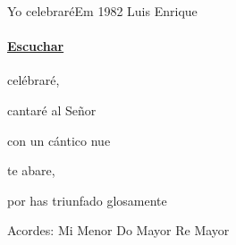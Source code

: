 \documentclass[12pt, spanish]{book}
\begin{document}
    \begin{song}{Yo celebraré}{Em}
    {1982} %
    {Luis Enrique}
    {} %
    {}
        \ifChordBk
        \paragraph{\mbox{}\hfill\protect\href{https://www.youtube.com/watch?v=YugnfLA3CZ4}{Escuchar}\mbox{}\hfill}
        \fi

        \begin{SBOpGroup}
             celébraré,~

            cantaré al Señor~

            con un cántico nue
        \end{SBOpGroup}
        \vskip 20pt
        \begin{SBOpGroup}
             te abare,

            por has triunfado glosamente
        \end{SBOpGroup}

        \ifChordBk
        \begin{SBOpGroup}
            Acordes:
            \upchord{\Em}\qquad Mi Menor \hfill
            \upchord{\C}\qquad Do Mayor \hfill\null\break
            \upchord{\D}\qquad Re Mayor \hfill\null\break
        \end{SBOpGroup}
        \fi
    \end{song}
\end{document}
